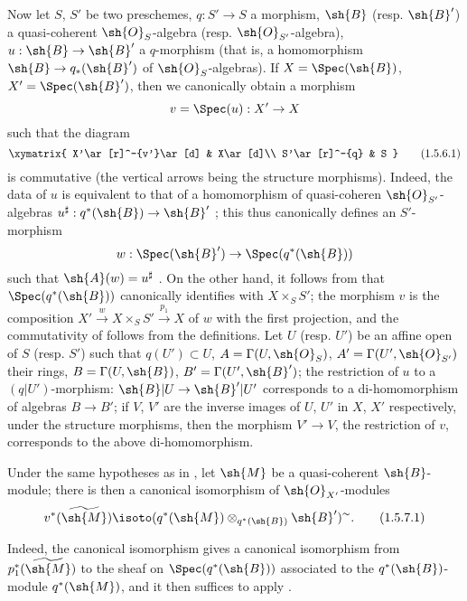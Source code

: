 \begin{env}[1.5.6]
\label{2.1.5.6}
Now let $S$, $S'$ be two preschemes, $q:S'\to S$ a morphism, $\sh{B}$ (resp. $\sh{B}'$) a quasi-coherent $\sh{O}_S$-algebra (resp. $\sh{O}_{S'}$-algebra), $u:\sh{B}\to\sh{B}'$ a $q$-morphism (that is, a homomorphism $\sh{B}\to q_*(\sh{B}')$ of $\sh{O}_S$-algebras).
If $X=\Spec(\sh{B})$, $X'=\Spec(\sh{B}')$, then we canonically obtain a morphism
\[
  v=\Spec(u):X'\to X
\]
such that the diagram
\[
\label{eq:2.1.5.6.1}
  \xymatrix{
    X'\ar[r]^-{v'}\ar[d] & X\ar[d]\\
    S'\ar[r]^-{q} & S
  }
  \tag{1.5.6.1}
\]
is commutative (the vertical arrows being the structure morphisms).
Indeed, the data of $u$ is equivalent to that of a homomorphism of quasi-coheren $\sh{O}_{S'}$-algebras $u^\sharp:q^*(\sh{B})\to\sh{B}'$ ; this thus canonically defines an $S'$-morphism
\[
  w:\Spec(\sh{B}')\to\Spec(q^*(\sh{B}))
\]
such that $\sh{A}(w)=u^\sharp$ .
On the other hand, it follows from  that $\Spec(q^*(\sh{B}))$ canonically identifies with $X\times_S S'$; the morphism $v$ is the composition $X'\xrightarrow{w}X\times_S S'\xrightarrow{p_1}X$ of $w$ with the first projection, and the commutativity of  follows from the definitions.
Let $U$ (resp. $U'$) be an affine open of $S$ (resp. $S'$) such that $q(U')\subset U$, $A=\Gamma(U,\sh{O}_S)$, $A'=\Gamma(U',\sh{O}_{S'})$ their rings, $B=\Gamma(U,\sh{B})$, $B'=\Gamma(U',\sh{B}')$; the restriction of $u$ to a $(q|U')$-morphism: $\sh{B}|U\to\sh{B}'|U'$ corresponds to a di-homomorphism of algebras $B\to B'$; if $V$, $V'$ are the inverse images of $U$, $U'$ in $X$, $X'$ respectively, under the structure morphisms, then the morphism $V'\to V$, the restriction of $v$, corresponds  to the above di-homomorphism.
\end{env}

\begin{env}[1.5.7]
\label{2.1.5.7}
Under the same hypotheses as in , let $\sh{M}$ be a quasi-coherent $\sh{B}$-module; there is then a canonical isomorphism of $\sh{O}_{X'}$-modules
\[
\label{eq:2.1.5.7.1}
  v^*(\widetilde{\sh{M}})\isoto(q^*(\sh{M})\otimes_{q^*(\sh{B})}\sh{B}')^\sim.
  \tag{1.5.7.1}
\]

Indeed, the canonical isomorphism  gives a canonical isomorphism from $p_1^*(\widetilde{\sh{M}})$ to the sheaf on $\Spec(q^*(\sh{B}))$ associated to the $q^*(\sh{B})$-module $q^*(\sh{M})$, and it then suffices to apply .
\end{env}

